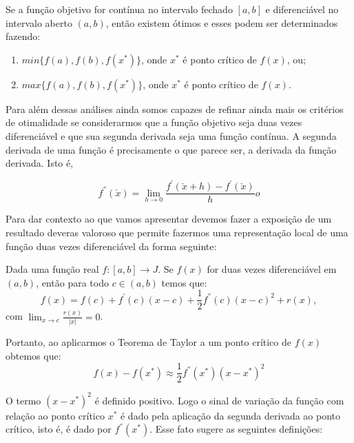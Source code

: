 \begin{theorem}
  Se a função objetivo for contínua no intervalo fechado $[a,b]$ e diferenciável no intervalo aberto $(a,b)$, então existem ótimos e esses podem ser determinados fazendo:
  \begin{enumerate}
  \item $min\{f(a), f(b), f(x^{*})\}$, onde $x^{*}$ é ponto crítico de $f(x)$, ou;
  \item $max\{f(a), f(b), f(x^{*})\}$, onde $x^{*}$ é ponto crítico de $f(x)$.
  \end{enumerate}
\end{theorem}

\par Para além dessas análises ainda somos capazes de refinar ainda mais os critérios de otimalidade se considerarmos que a função objetivo seja duas vezes diferenciável e que sua segunda derivada seja uma função contínua. A segunda derivada de uma função é precisamente o que parece ser, a derivada da função derivada. Isto é,

\begin{equation}
  f^{''}(\check{x}) = \lim_{h \rightarrow 0} \frac{f^{'}(\check{x}+h)- f^{'}(\check{x})}{h}o
\end{equation}

\par Para dar contexto ao que vamos apresentar devemos fazer a exposição de um resultado deveras valoroso que permite fazermos uma representação local de uma função duas vezes diferenciável da forma seguinte:

\begin{theorem}
  Dada uma função real $f:[a,b] \rightarrow J$. Se $f(x)$ for duas vezes diferenciável em $(a,b)$, então para todo $c \in (a,b)$ temos que:
  \begin{equation}
    f(x) = f(c)+ f^{'}(c)(x-c) + \frac{1}{2} f^{''}(c)(x-c)^2 + r(x),
  \end{equation}
  com $\lim_{x \rightarrow c}\frac{r(x)}{|x|} = 0$.
\end{theorem}


\par Portanto, ao aplicarmos o Teorema de Taylor a um ponto crítico de $f(x)$ obtemos que:
\begin{equation}
  f(x) - f(x^*) \approx \frac{1}{2} f^{''}(x^*)(x-x^*)^2
\end{equation}

\par O termo $(x-x^*)^2$ é definido positivo. Logo o sinal de variação da função com relação ao ponto crítico $x^*$ é dado pela aplicação da segunda derivada ao ponto crítico, isto é, é dado por $f^{''}(x^*)$. Esse fato sugere as seguintes definições:

